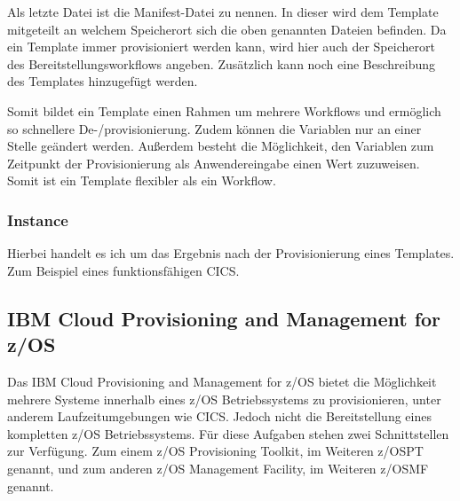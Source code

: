 Als letzte Datei ist die Manifest-Datei zu nennen.
In dieser wird dem Template mitgeteilt an welchem Speicherort sich die oben genannten Dateien befinden.
Da ein Template immer provisioniert werden kann, wird hier auch der Speicherort des Bereitstellungsworkflows angeben.
Zusätzlich kann noch eine Beschreibung des Templates hinzugefügt werden.

Somit bildet ein Template einen Rahmen um mehrere Workflows und ermöglich so schnellere De-/provisionierung.
Zudem können die Variablen nur an einer Stelle geändert werden.
Außerdem besteht die Möglichkeit, den Variablen zum Zeitpunkt der Provisionierung als Anwendereingabe einen Wert zuzuweisen.
Somit ist ein Template flexibler als ein Workflow.
\cite{IBM.2019}

\subsubsection{Instance}
Hierbei handelt es ich um das Ergebnis nach der Provisionierung eines Templates.
Zum Beispiel eines funktionsfähigen CICS.

\subsection{IBM Cloud Provisioning and Management for z/OS}
Das IBM Cloud Provisioning and Management for z/OS bietet die Möglichkeit mehrere Systeme innerhalb eines z/OS Betriebssystems zu provisionieren, unter anderem Laufzeitumgebungen wie CICS.
Jedoch nicht die Bereitstellung eines kompletten z/OS Betriebssystems.
Für diese Aufgaben stehen zwei Schnittstellen zur Verfügung.
Zum einem z/OS Provisioning Toolkit, im Weiteren z/OSPT genannt, und zum anderen z/OS Management Facility, im Weiteren z/OSMF genannt.
\cite{KeithWinnardGaryPuchkoffHirenShah.2016}

